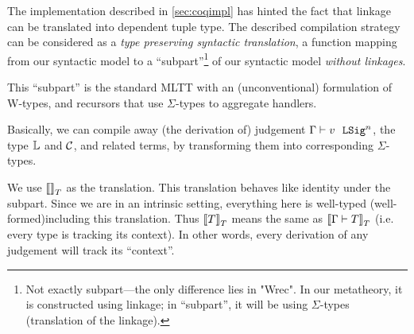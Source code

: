 The implementation described in \cref{sec:coqimpl} has hinted the fact that
linkage can be translated into dependent tuple type.
The described compilation strategy can be considered as
a \textit{type preserving syntactic translation}, a function mapping from our syntactic
model to a ``subpart''\footnote{Not exactly subpart---the only
difference lies in "Wrec". In our metatheory, it is constructed
using linkage; in ``subpart'', it will be using $\Sigma$-types (translation
of the linkage).} of our syntactic model \textit{without
linkages}.

This ``subpart'' is the standard MLTT with an
(unconventional) formulation of W-types,
and recursors that use $\Sigma$-types to aggregate handlers.

Basically, we can compile away (the derivation of) judgement $ {\Gamma} \vdash {v} \ \ \texttt{LSig}^{n} $,
the type $\mathbb{L}$ and $\mathcal{C}$, and related terms, by transforming them into
corresponding $\Sigma$-types.

 


We use ${{\llbracket {} \rrbracket}_T}$ as the translation. This translation behaves like identity
under the subpart. Since we are in an intrinsic setting, everything here
is well-typed (well-formed)including this translation. Thus
${{\llbracket {T} \rrbracket}_T}$ means the same as ${{\llbracket {\ensuremath{ {\Gamma} \vdash {T} }} \rrbracket}_T}$
(i.e. every type is tracking its context). In other words, every
derivation of any judgement will track its ``context''. 


